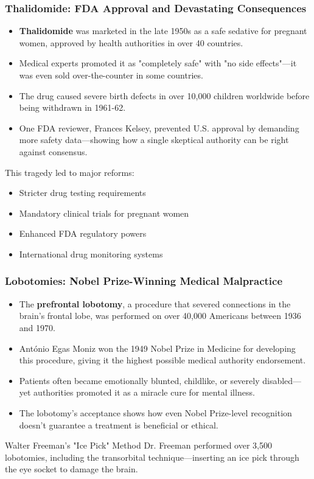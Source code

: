 \documentclass{beamer}
\begin{document}
	\begin{frame}
		\frametitle{Thalidomide: FDA Approval and Devastating Consequences}
		\begin{itemize}
			\item \textbf{Thalidomide} was marketed in the late 1950s as a safe sedative for pregnant women, approved by health authorities in over 40 countries.
			\item Medical experts promoted it as "completely safe" with "no side effects"—it was even sold over-the-counter in some countries.
			\item The drug caused severe birth defects in over 10,000 children worldwide before being withdrawn in 1961-62.
			\item One FDA reviewer, Frances Kelsey, prevented U.S. approval by demanding more safety data—showing how a single skeptical authority can be right against consensus.
		\end{itemize}
		
		\begin{example}
			This tragedy led to major reforms:
			\begin{itemize}
				\item Stricter drug testing requirements
				\item Mandatory clinical trials for pregnant women
				\item Enhanced FDA regulatory powers
				\item International drug monitoring systems
			\end{itemize}
		\end{example}
	\end{frame}
	
	\begin{frame}
		\frametitle{Lobotomies: Nobel Prize-Winning Medical Malpractice}
		\begin{itemize}
			\item The \textbf{prefrontal lobotomy}, a procedure that severed connections in the brain's frontal lobe, was performed on over 40,000 Americans between 1936 and 1970.
			\item António Egas Moniz won the 1949 Nobel Prize in Medicine for developing this procedure, giving it the highest possible medical authority endorsement.
			\item Patients often became emotionally blunted, childlike, or severely disabled—yet authorities promoted it as a miracle cure for mental illness.
			\item The lobotomy's acceptance shows how even Nobel Prize-level recognition doesn't guarantee a treatment is beneficial or ethical.
		\end{itemize}
		
		\begin{alertblock}{Walter Freeman's "Ice Pick" Method}
			Dr. Freeman performed over 3,500 lobotomies, including the transorbital technique—inserting an ice pick through the eye socket to damage the brain.
		\end{alertblock}
	\end{frame}
	
\end{document}
